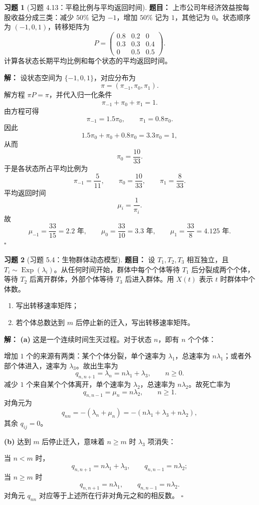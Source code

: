 \documentclass[12pt,a4paper,openany]{ctexrep}
\theoremstyle{definition}
\newtheorem{exercise}{习题}[section]
\newenvironment{solution}{\par\noindent\textbf{解：}}{\hfill$\square$\par}
\newcommand{\Exp}{\operatorname{Exp}}
\begin{document}
\begin{exercise}[习题 4.13：平稳比例与平均返回时间]
\textbf{题目：}
上市公司年经济效益按每股收益分成三类：减少 $50\%$ 记为 $-1$，增加 $50\%$ 记为 $1$，其他记为 $0$。状态顺序为 $(-1,0,1)$，转移矩阵为
\[
P=
\begin{pmatrix}
0.8&0.2&0\\
0.3&0.3&0.4\\
0&0.5&0.5
\end{pmatrix}.
\]
计算各状态长期平均比例和每个状态的平均返回时间。
\end{exercise}
\begin{solution}
设状态空间为 $\{-1,0,1\}$，对应分布为
\[
\pi=(\pi_{-1},\pi_0,\pi_1).
\]
解方程 $\pi P=\pi$，并代入归一化条件
\[
\pi_{-1}+\pi_0+\pi_1=1.
\]
由方程可得
\[
\pi_{-1}=1.5\pi_0,\qquad \pi_1=0.8\pi_0.
\]
因此
\[
1.5\pi_0+\pi_0+0.8\pi_0=3.3\pi_0=1,
\]
从而
\[
\pi_0=\frac{10}{33}.
\]
于是各状态所占平均比例为
\[
\pi_{-1}=\frac5{11},\qquad
\pi_0=\frac{10}{33},\qquad
\pi_1=\frac8{33}.
\]
平均返回时间
\[
\mu_i=\frac1{\pi_i}.
\]
故
\[
\mu_{-1}=\frac{33}{15}=2.2\text{ 年},\qquad
\mu_0=\frac{33}{10}=3.3\text{ 年},\qquad
\mu_1=\frac{33}{8}=4.125\text{ 年}.
\]
\end{solution}

\begin{exercise}[习题 5.4：生物群体动态模型]
\textbf{题目：}
设 $T_1,T_2,T_3$ 相互独立，且 $T_i\sim\Exp(\lambda_i)$。从任何时间开始，群体中每个个体等待 $T_1$ 后分裂成两个个体，等待 $T_2$ 后离开群体，外部个体等待 $T_3$ 后进入群体。用 $X(t)$ 表示 $t$ 时群体中个体数。
\begin{enumerate}[label=(\alph*)]
	\item 写出转移速率矩阵；
	\item 若个体总数达到 $m$ 后停止新的迁入，写出转移速率矩阵。
\end{enumerate}
\end{exercise}
\begin{solution}
\textbf{(a)} 这是一个连续时间生灭过程。对于状态 $n$，即有 $n$ 个个体：

增加 $1$ 个的来源有两类：某个个体分裂，单个速率为 $\lambda_1$，总速率为 $n\lambda_1$；或者外部个体进入，速率为 $\lambda_3$。故出生率为
\[
q_{n,n+1}=\lambda_n=n\lambda_1+\lambda_3,\qquad n\ge0.
\]
减少 $1$ 个来自某个个体离开，单个速率为 $\lambda_2$，总速率为 $n\lambda_2$。故死亡率为
\[
q_{n,n-1}=\mu_n=n\lambda_2,\qquad n\ge1.
\]
对角元为
\[
q_{nn}=-(\lambda_n+\mu_n)=-(n\lambda_1+\lambda_3+n\lambda_2),
\]
其余 $q_{ij}=0$。

\textbf{(b)} 达到 $m$ 后停止迁入，意味着 $n\ge m$ 时 $\lambda_3$ 项消失：

当 $n<m$ 时，
\[
q_{n,n+1}=n\lambda_1+\lambda_3,\qquad q_{n,n-1}=n\lambda_2;
\]
当 $n\ge m$ 时
\[
q_{n,n+1}=n\lambda_1,\qquad q_{n,n-1}=n\lambda_2.
\]
对角元 $q_{nn}$ 对应等于上述所在行非对角元之和的相反数。
\end{solution}
\end{document}
